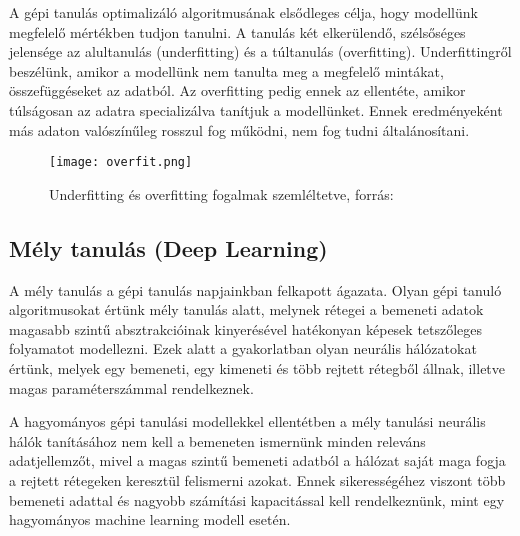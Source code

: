 A gépi tanulás optimalizáló algoritmusának elsődleges célja, hogy modellünk megfelelő mértékben tudjon tanulni. A tanulás két elkerülendő, szélsőséges jelensége az alultanulás (underfitting) és a túltanulás (overfitting). Underfittingről beszélünk, amikor a modellünk nem tanulta meg a megfelelő mintákat, összefüggéseket az adatból. Az overfitting pedig ennek az ellentéte, amikor túlságosan az adatra specializálva tanítjuk a modellünket. Ennek eredményeként más adaton valószínűleg rosszul fog működni, nem fog tudni általánosítani.

\begin{figure}[H]
  \texttt{[image: overfit.png]}
  \caption{Underfitting és overfitting fogalmak szemléltetve, forrás: \cite{deeplearningbook} }
\end{figure}


\subsection{Mély tanulás (Deep Learning)}

A mély tanulás a gépi tanulás napjainkban felkapott ágazata. Olyan gépi tanuló algoritmusokat értünk mély tanulás alatt, melynek rétegei a bemeneti adatok magasabb szintű absztrakcióinak kinyerésével hatékonyan képesek tetszőleges folyamatot modellezni. Ezek alatt a gyakorlatban olyan neurális hálózatokat értünk, melyek egy bemeneti, egy kimeneti és több rejtett rétegből állnak, illetve magas paraméterszámmal rendelkeznek. \cite{azuredl}

A hagyományos gépi tanulási modellekkel ellentétben a mély tanulási neurális hálók tanításához nem kell a bemeneten ismernünk minden releváns adatjellemzőt, mivel a magas szintű bemeneti adatból a hálózat saját maga fogja a rejtett rétegeken keresztül felismerni azokat. Ennek sikerességéhez viszont több bemeneti adattal és nagyobb számítási kapacitással kell rendelkeznünk, mint egy hagyományos machine learning modell esetén. \cite{azuredl}


